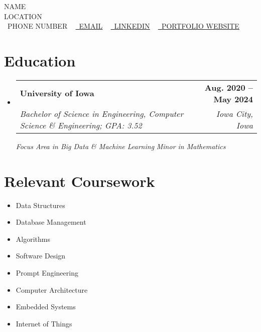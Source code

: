 \documentclass[letterpaper,11pt]{article}
\makeatletter
\newcommand{\resumeSubheading}[4]{
  \vspace{-2pt}\item
    \begin{tabular*}{1.0\textwidth}[t]{l@{\extracolsep{\fill}}r}
      \textbf{#1} & \textbf{\small #2} \\
      \textit{\small#3} & \textit{\small #4} \\
    \end{tabular*}\vspace{-7pt}
}
\newcommand{\resumeSubHeadingListStart}{\begin{itemize}[leftmargin=0.0in, label={}]}
\newcommand{\resumeSubHeadingListEnd}{\end{itemize}}
\makeatother
\begin{document}
\begin{center}
    {\Huge \scshape NAME} \\ \vspace{1pt}
    LOCATION \\ \vspace{1pt}
    \small \raisebox{-0.1\height}\faPhone\ {PHONE NUMBER} ~ \href{mailto:EMAIL}{\raisebox{-0.2\height}\faEnvelope\  \underline{EMAIL}} ~ 
    \href{LINKEDIN}{\raisebox{-0.2\height}\faLinkedin\ \underline{LINKEDIN}}  ~
    \href{PORTFOLIO WEBSITE}{\raisebox{-0.2\height}\faReadme\ \underline{PORTFOLIO WEBSITE}}
    
\end{center}

\section{Education}
  \resumeSubHeadingListStart
    \resumeSubheading
      {University of Iowa}{Aug. 2020 -- May 2024}
    {Bachelor of Science in Engineering, Computer Science \& Engineering; GPA: 3.52
    }{Iowa City, Iowa}
    \vspace{2pt}
    \newline
            \emph
                {Focus Area in Big Data \& Machine Learning}
            \newline
            \emph
                {Minor in Mathematics}

  \resumeSubHeadingListEnd

\section{Relevant Coursework}
        \begin{multicols}{4}
            \begin{itemize}[itemsep=-5pt, parsep=5pt]
                \item\small Data Structures
                \item Database Management
                \item Algorithms
                \item Software Design
                \item Prompt Engineering
                \item Computer Architecture
                \item Embedded Systems
                \item Internet of Things
            \end{itemize}
        \end{multicols}
\end{document}

